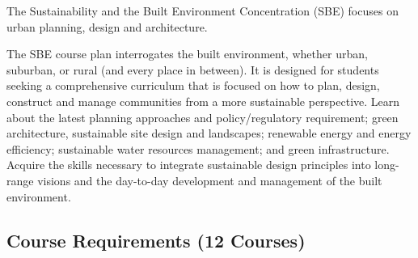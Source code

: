 \documentclass{article}\usepackage[]{graphicx}\usepackage[]{xcolor}
\begin{document}
The Sustainability and the Built Environment Concentration (SBE) focuses on urban planning, design and architecture. 

The SBE course plan interrogates the built environment, whether urban, suburban, or rural (and every place in between). It is designed for students seeking a comprehensive curriculum that is focused on how to plan, design, construct and manage communities from a more sustainable perspective. Learn about the latest planning approaches and policy/regulatory requirement; green architecture, sustainable site design and landscapes; renewable energy and energy efficiency; sustainable water resources management; and green infrastructure. Acquire the skills necessary to integrate sustainable design principles into long-range visions and the day-to-day development and management of the built environment.


\subsection{Course Requirements (12 Courses)}
\end{document}
